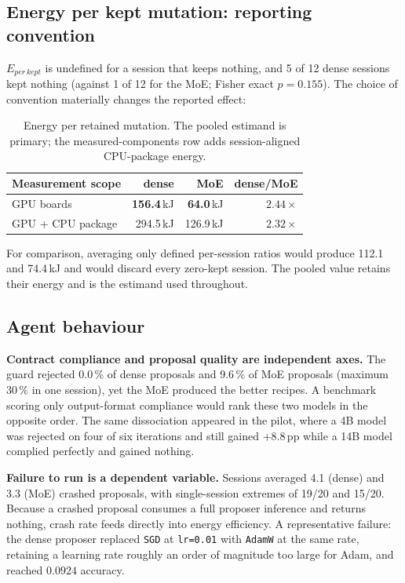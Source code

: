 \subsection{Energy per kept mutation: reporting convention}

$E_{\mathit{per\,kept}}$ is undefined for a session that keeps nothing, and 5 of
12 dense sessions kept nothing (against 1 of 12 for the MoE; Fisher exact
$p=0.155$). The choice of convention materially changes the reported effect:

\begin{table}[htbp]
\centering
\caption{Energy per retained mutation. The pooled estimand is primary; the
measured-components row adds session-aligned CPU-package energy.}
\label{tab:perkept}
\small
\begin{tabular}{lrrr}
\toprule
Measurement scope & dense & MoE & dense/MoE \\
\midrule
GPU boards & \textbf{156.4}\,kJ & \textbf{64.0}\,kJ & $\mathbf{2.44\times}$ \\
GPU + CPU package & 294.5\,kJ & 126.9\,kJ & $2.32\times$ \\
\bottomrule
\end{tabular}
\end{table}

For comparison, averaging only defined per-session ratios would produce 112.1
and 74.4\,kJ and would discard every zero-kept session. The pooled value retains
their energy and is the estimand used throughout.

\subsection{Agent behaviour}

\textbf{Contract compliance and proposal quality are independent axes.} The
guard rejected 0.0\,\% of dense proposals and 9.6\,\% of MoE proposals (maximum
30\,\% in one session), yet the MoE produced the better recipes. A benchmark
scoring only output-format compliance would rank these two models in the opposite
order. The same dissociation appeared in the pilot, where a 4B model was rejected
on four of six iterations and still gained $+8.8$\,pp while a 14B model complied
perfectly and gained nothing.

\textbf{Failure to run is a dependent variable.} Sessions averaged 4.1 (dense) and
3.3 (MoE) crashed proposals, with single-session extremes of 19/20 and 15/20.
Because a crashed proposal consumes a full proposer inference and returns
nothing, crash rate feeds directly into energy efficiency. A representative
failure: the dense proposer replaced
\texttt{SGD} at \texttt{lr=0.01} with \texttt{AdamW} at the same rate, retaining a
learning rate roughly an order of magnitude too large for Adam, and reached
$0.0924$ accuracy.

